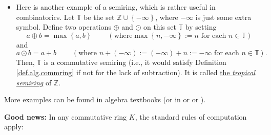 \begin{itemize}
Fix a set $S$. Consider the power set $\mathcal{P}\left(  S\right)  $ of $S$
(that is, the set of all subsets of $S$). This power set $\mathcal{P}\left(
S\right)  $ is a commutative ring if we equip it with the operation
$\bigtriangleup$ as addition (that is, $X\oplus Y=X\bigtriangleup Y$ for any
subsets $X$ and $Y$ of $S$), with the same operation $\bigtriangleup$ as
subtraction (that is, $X\ominus Y=X\bigtriangleup Y$), and with the operation
$\cap$ as multiplication (that is, $X\odot Y=X\cap Y$), and with the elements
$\varnothing$ and $S$ as zero and unity (that is, with $\mathbf{0}%
=\varnothing$ and $\mathbf{1}=S$). Indeed, it is straightforward to see that
all the axioms in Definition \ref{def.alg.commring} hold for this ring. (For
example, distributivity holds because any three sets $A,B,C$ satisfy
$A\cap\left(  B\bigtriangleup C\right)  =\left(  A\cap B\right)
\bigtriangleup\left(  A\cap C\right)  $ and $\left(  A\bigtriangleup B\right)
\cap C=\left(  A\cap C\right)  \bigtriangleup\left(  B\cap C\right)  $.) This
is an example of a \emph{Boolean ring} (i.e., a ring in which $aa=a$ for each
element $a$ of the ring).

\item Here is another example of a semiring, which is rather useful in
combinatorics. Let $\mathbb{T}$ be the set $\mathbb{Z}\cup\left\{
-\infty\right\}  $, where $-\infty$ is just some extra symbol. Define two
operations $\oplus$ and $\odot$ on this set $\mathbb{T}$ by setting%
\[
a\oplus b=\max\left\{  a,b\right\}  \ \ \ \ \ \ \ \ \ \ \left(  \text{where
}\max\left\{  n,-\infty\right\}  :=n\text{ for each }n\in\mathbb{T}\right)
\]
and%
\[
a\odot b=a+b\ \ \ \ \ \ \ \ \ \ \left(  \text{where }n+\left(  -\infty\right)
:=\left(  -\infty\right)  +n:=-\infty\text{ for each }n\in\mathbb{T}\right)
.
\]
Then, $\mathbb{T}$ is a commutative semiring (i.e., it would satisfy
Definition \ref{def.alg.commring} if not for the lack of subtraction). It is
called \href{https://en.wikipedia.org/wiki/Tropical_semiring}{the
\emph{tropical semiring}} of $\mathbb{Z}$.
\end{itemize}

More examples can be found in algebra textbooks (or in \cite[\S 6.1]{detnotes}
or \cite[\S 5.2]{19s} or \cite[\S 2.1.2, \S 2.3.2, \S 2.3.3]{23wa}). \medskip

\textbf{Good news:} In any commutative ring $K$, the standard rules of
computation apply:

